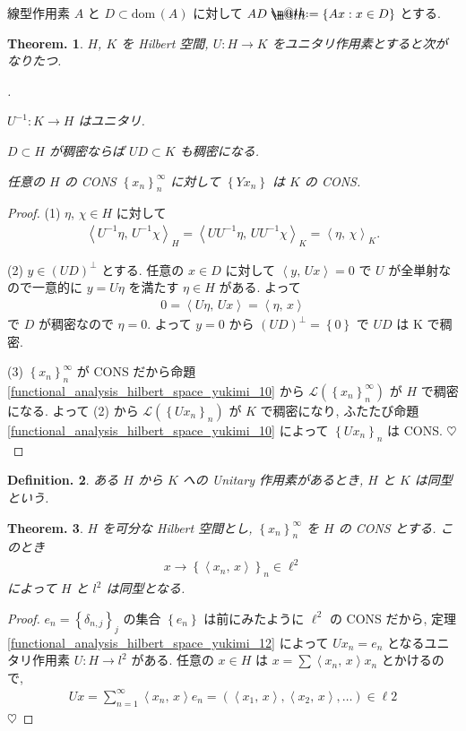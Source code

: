 \documentclass[openany, a4paper, oneside]{book}
\makeatletter
\newcounter{enum2}
\renewenvironment{enumerate}{%
\begin{list}%
{%
\arabic{enum2}.\ \,%
}%
{%
\usecounter{enum2}
\setlength{\itemindent}{0pt}%
\setlength{\leftmargin}{6pt}%
\setlength{\rightmargin}{0pt}%
\setlength{\labelsep}{0pt}%
\setlength{\labelwidth}{6pt}%
\setlength{\itemsep}{0pt}%
\setlength{\parsep}{0pt}%
\setlength{\listparindent}{0pt}%
}
}{%
\end{list}%
}
\newcommand*{\defeq}{\mathrel{\rlap{%
\raisebox{0.3ex}{$\m@th\cdot$}}%
\raisebox{-0.3ex}{$\m@th\cdot$}}%
=}
\newcommand{\dom}{\mathrm{dom}\,}
\theoremstyle{break}
\newtheorem{thm}{Theorem.}[section]
\theoremstyle{breakdefn}
\newtheorem{defn}[thm]{Definition.}
\newcommand{\rbk}[1]{\left (#1\right)}
\newcommand{\cbk}[1]{\left\{#1\right\}}
\newcommand{\bkt}[2]{\left\langle#1,\,#2\right\rangle}
\newcommand{\set}[2]{\left\{#1 : #2\right\}}
\newcommand{\calL}{\mathcal{L}}
\makeatother
\begin{document}
線型作用素 $A$ と $D \subset \dom (A)$ に対して $AD \defeq \set{Ax}{x \in D}$ とする.
\begin{thm}
 $H$, $K$ を Hilbert 空間, $U \colon H \to K$ をユニタリ作用素とすると次がなりたつ.
\begin{enumerate}
\item $U^{-1} \colon K \to H$ はユニタリ.
\item $D \subset H$ が稠密ならば $U D \subset K$ も稠密になる.
\item 任意の $H$ の CONS $\cbk{x_n}_n^\infty$ に対して $\cbk{Yx_n}$ は $K$ の CONS.
\end{enumerate}
\end{thm}
\begin{proof}
(1) $\eta$, $\chi \in H$ に対して
\begin{align}
 \bkt{U^{-1} \eta}{U^{-1} \chi}_H
 =
 \bkt{U U^{-1} \eta}{U U^{-1} \chi}_K
 =
 \bkt{\eta}{\chi}_K.
\end{align}

(2) $y \in (UD)^\perp$ とする.
任意の $x \in D$ に対して $\bkt{y}{Ux} = 0$ で $U$ が全単射なので一意的に $y = U\eta$ を満たす $\eta \in H$ がある.
よって
\begin{align}
 0
 =
 \bkt{U \eta}{Ux}
 =
 \bkt{\eta}{x}
\end{align}
で $D$ が稠密なので $\eta = 0$.
よって $y = 0$ から $(UD)^\perp = \cbk{0}$ で $UD$ は K で稠密.

(3) $\cbk{x_n}_n^\infty$ が CONS だから命題 \ref{functional_analysis_hilbert_space_yukimi_10} から
$\calL (\cbk{x_n}_n^\infty)$ が $H$ で稠密になる.
よって (2) から $\calL (\cbk{Ux_n}_n)$ が $K$ で稠密になり,
ふたたび命題 \ref{functional_analysis_hilbert_space_yukimi_10} によって $\cbk{Ux_n}_n$ は CONS.
$\heartsuit$
\end{proof}

\begin{defn}
 ある $H$ から $K$ への Unitary 作用素があるとき, $H$ と $K$ は同型という.
\end{defn}
\begin{thm}
 $H$ を可分な Hilbert 空間とし, $\cbk{x_n}_n^\infty$ を $H$ の CONS とする.
 このとき
 \begin{align}
  x \to \cbk{\bkt{x_n}{x}}_n \in \ell^2
 \end{align}
 によって $H$ と $l^2$ は同型となる.
\end{thm}
\begin{proof}
$e_n = \cbk{\delta_{n,j}}_j$ の集合 $\cbk{e_n}$ は前にみたように $\ell^2$ の CONS だから,
定理 \ref{functional_analysis_hilbert_space_yukimi_12} によって $Ux_n = e_n$ となるユニタリ作用素 $U \colon H \to l^2$ がある.
任意の $x\in H$ は $x = \sum \bkt{x_n}{x} x_n$ とかけるので,
\begin{align}
 Ux
 =
 \sum_{n=1}^{\infty} \bkt{x_n}{x} e_n
 =
 \rbk{\bkt{x_1}{x}, \bkt{x_2}{x}, \dots} \in \ell2
\end{align}
$\heartsuit$
\end{proof}
\end{document}
